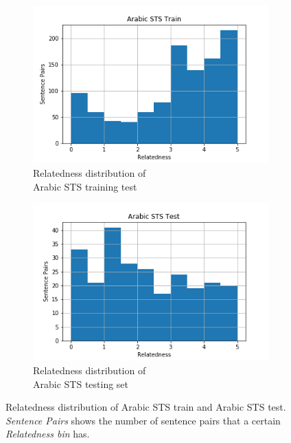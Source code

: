\begin{enumerate}
\begin{figure}
	\captionsetup[subfigure]{justification=centering}
	\centering
	\begin{subfigure}[b]{.5\textwidth}
		\centering
		\includegraphics[width=\textwidth]{figures/semantic_textual_similarity/introduction/sts_arabic_train.png}
		\caption{Relatedness distribution of \\ Arabic STS  training test}
		\label{fig:arabic_train_relatedness}
	\end{subfigure}%
	\begin{subfigure}[b]{.5\textwidth}
		\centering
		\includegraphics[width=\textwidth]{figures/semantic_textual_similarity/introduction/sts_arabic_test.png}
		\caption{Relatedness distribution of \\ Arabic STS  testing set}
		\label{fig:arabic_test_relatedness}
	\end{subfigure}
	\caption[Relatedness distribution of Arabic STS train and Arabic STS test]{Relatedness distribution of Arabic STS train and Arabic STS test. \textit{Sentence Pairs} shows the number of sentence pairs that a certain \textit{Relatedness bin} has.}
	\label{fig:arabic_sts_relatedness}
\end{figure} 




\end{enumerate}
